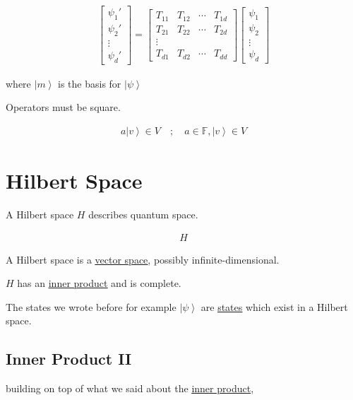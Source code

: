 \documentclass[
]{article}
\let\oldhyperref\hyperref
\renewcommand{\hyperref}[2][]{\oldhyperref[#1]{\underline{#2}}}
\providecommand{\ket}[1]{\left\lvert #1 \right\rangle}
\begin{document}
\begin{gather*}
	\begin{bmatrix}
		\psi_1' \\
		\psi_2' \\
		\vdots  \\
		\psi_d'
	\end{bmatrix}=
	\begin{bmatrix}
		T_{11} & T_{12} & \cdots & T_{1d} \\
		T_{21} & T_{22} & \cdots & T_{2d} \\
		\vdots                            \\
		T_{d1} & T_{d2} & \cdots & T_{dd}
	\end{bmatrix}\begin{bmatrix}\psi_1 \\ \psi_2 \\ \vdots \\\psi_d\end{bmatrix}
\end{gather*}

where \(\ket{m}\) is the basis for \(\ket{\psi}\)

Operators must be square.

\begin{gather*}
	a\ket{v}\in V\quad ;\quad a\in \mathbb{F},\ket{v}\in V
\end{gather*}

\section{Hilbert Space}\label{hilbert-spaces}

A Hilbert space \(H\) describes quantum space.

\begin{gather*}
	H
\end{gather*}

A Hilbert space is a \hyperref[vector-spaces]{vector space}, possibly infinite-dimensional.

\(H\) has an \hyperref[inner-product]{inner product} and is complete.

The states we wrote before for example \(\ket{\psi}\) are \hyperref[states]{states} which
exist in a Hilbert space.

\subsection{Inner Product II}\label{inner-product-ii}

building on top of what we said about the \hyperref[inner-product]{inner product},
\end{document}
